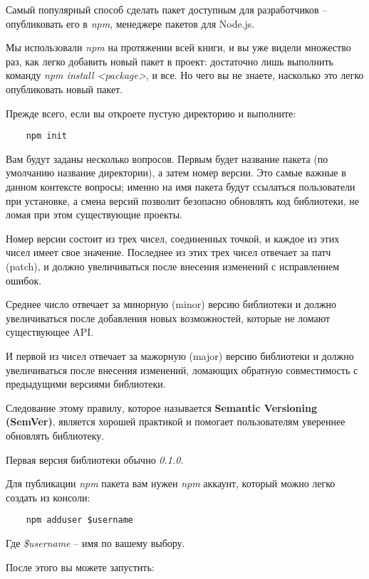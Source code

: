 Самый популярный способ сделать пакет доступным для разработчиков -- опубликовать его в \textit{npm}, менеджере пакетов для Node.js.

Мы использовали \textit{npm} на протяжении всей книги, и вы уже видели множество раз, как легко добавить новый пакет в проект: достаточно лишь выполнить команду \textit{npm install <package>}, и все. Но чего вы не знаете, насколько это легко опубликовать новый пакет.

Прежде всего, если вы откроете пустую директорию и выполните:

\begin{lstlisting}
	npm init
\end{lstlisting}

Вам будут заданы несколько вопросов. Первым будет название пакета (по умолчанию название директории), а затем номер версии. Это самые важные в данном контексте вопросы; именно на имя пакета будут ссылаться пользователи при установке, а смена версий позволит безопасно обновлять код библиотеки, не ломая при этом существующие проекты.

Номер версии состоит из трех чисел, соединенных точкой, и каждое из этих чисел имеет свое значение. Последнее из этих трех чисел отвечает за патч (patch), и должно увеличиваться после внесения изменений с исправлением ошибок.

Среднее число отвечает за минорную (minor) версию библиотеки и должно увеличиваться после добавления новых возможностей, которые не ломают существующее API.

И первой из чисел отвечает за мажорную (major) версию библиотеки и должно увеличиваться после внесения изменений, ломающих обратную совместимость с предыдущими версиями библиотеки.

Следование этому правилу, которое называется \textbf{Semantic Versioning (SemVer)}, является хорошей практикой и помогает пользователям увереннее обновлять библиотеку.

Первая версия библиотеки обычно \textit{0.1.0}. 

Для публикации \textit{npm} пакета вам нужен \textit{npm} аккаунт, который можно легко создать из консоли:

\begin{lstlisting}
	npm adduser $username
\end{lstlisting}

Где \textit{\$username} -- имя по вашему выбору.

После этого вы можете запустить:

